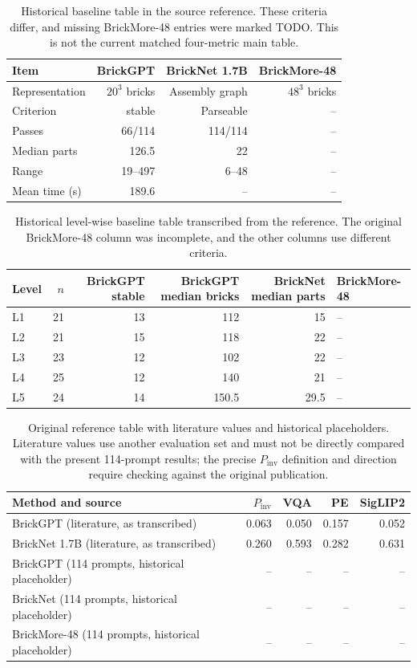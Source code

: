 \begin{table}[!htbp]\centering\small
\begin{tabular}{lrrr}\toprule
Item & BrickGPT & BrickNet 1.7B & BrickMore-48 \\ \midrule
Representation & $20^3$ bricks & Assembly graph & $48^3$ bricks \\
Criterion & stable & Parseable & -- \\
Passes & 66/114 & 114/114 & -- \\
Median parts & 126.5 & 22 & -- \\
Range & 19--497 & 6--48 & -- \\
Mean time (s) & 189.6 & -- & -- \\
\bottomrule\end{tabular}
\caption{Historical baseline table in the source reference. These criteria differ, and missing BrickMore-48 entries were marked TODO. This is not the current matched four-metric main table.}
\end{table}

\begin{table}[!htbp]\centering\small
\begin{tabular}{lrrrrl}\toprule
Level & $n$ & BrickGPT stable & BrickGPT median bricks & BrickNet median parts & BrickMore-48 \\ \midrule
L1 & 21 & 13 & 112 & 15 & -- \\
L2 & 21 & 15 & 118 & 22 & -- \\
L3 & 23 & 12 & 102 & 22 & -- \\
L4 & 25 & 12 & 140 & 21 & -- \\
L5 & 24 & 14 & 150.5 & 29.5 & -- \\
\bottomrule\end{tabular}
\caption{Historical level-wise baseline table transcribed from the reference. The original BrickMore-48 column was incomplete, and the other columns use different criteria.}
\end{table}

\begin{table}[!htbp]\centering\small
\begin{tabular}{lrrrr}\toprule
Method and source & $P_{\mathrm{inv}}$ & VQA & PE & SigLIP2 \\ \midrule
BrickGPT (literature, as transcribed) & 0.063 & 0.050 & 0.157 & 0.052 \\
BrickNet 1.7B (literature, as transcribed) & 0.260 & 0.593 & 0.282 & 0.631 \\
BrickGPT (114 prompts, historical placeholder) & -- & -- & -- & -- \\
BrickNet (114 prompts, historical placeholder) & -- & -- & -- & -- \\
BrickMore-48 (114 prompts, historical placeholder) & -- & -- & -- & -- \\
\bottomrule\end{tabular}
\caption{Original reference table with literature values and historical placeholders. Literature values use another evaluation set and must not be directly compared with the present 114-prompt results; the precise $P_{\mathrm{inv}}$ definition and direction require checking against the original publication.}
\end{table}

